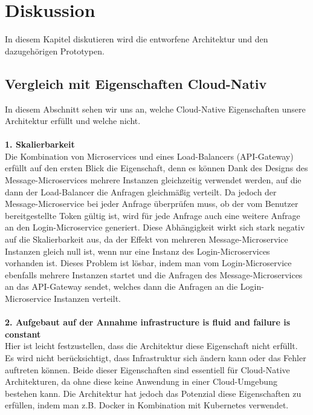 \chapter{Diskussion}
In diesem Kapitel diskutieren wird die entworfene Architektur und den dazugehörigen Prototypen.

\section{Vergleich mit Eigenschaften Cloud-Nativ}
In diesem Abschnitt sehen wir uns an, welche Cloud-Native Eigenschaften unsere Architektur erfüllt und welche nicht.\\
\\
\textbf{1. Skalierbarkeit}\\
Die Kombination von Microservices und eines Load-Balancers (API-Gateway) erfüllt auf den ersten Blick die Eigenschaft, denn es können Dank des Designs des Message-Microservices mehrere Instanzen gleichzeitig verwendet werden, auf die dann der Load-Balancer die Anfragen gleichmäßig verteilt. Da jedoch der Message-Microservice bei jeder Anfrage überprüfen muss, ob der vom Benutzer bereitgestellte Token gültig ist, wird für jede Anfrage auch eine weitere Anfrage an den Login-Microservice generiert. Diese Abhängigkeit wirkt sich stark negativ auf die Skalierbarkeit aus, da der Effekt von mehreren Message-Microservice Instanzen gleich null ist, wenn nur eine Instanz des Login-Microservices vorhanden ist. Dieses Problem ist lösbar, indem man vom Login-Microservice ebenfalls mehrere Instanzen startet und die Anfragen des Message-Microservices an das API-Gateway sendet, welches dann die Anfragen an die Login-Microservice Instanzen verteilt.\\
\\
\textbf{2. Aufgebaut auf der Annahme \glqq infrastructure is fluid and failure is constant\grqq{}}\\
Hier ist leicht festzustellen, dass die Architektur diese Eigenschaft nicht erfüllt. Es wird nicht berücksichtigt, dass Infrastruktur sich ändern kann oder das Fehler auftreten können. Beide dieser Eigenschaften sind essentiell für Cloud-Native Architekturen, da ohne diese keine Anwendung in einer Cloud-Umgebung bestehen kann. Die Architektur hat jedoch das Potenzial diese Eigenschaften zu erfüllen, indem man z.B. Docker in Kombination mit Kubernetes verwendet.\\
\\
